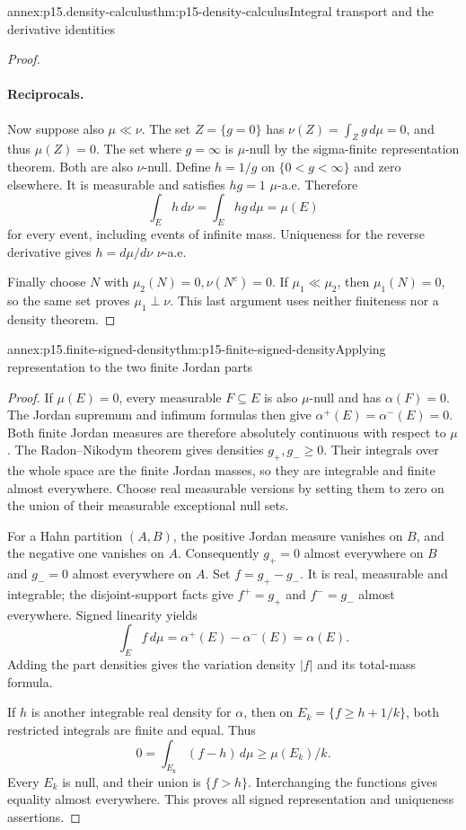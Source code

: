 \begin{annexitem}{annex:p15.density-calculus}{thm:p15-density-calculus}{Integral transport and the derivative identities}
\begin{proof}
\paragraph{Reciprocals.}
Now suppose also \(\mu\ll\nu\).
The set \(Z=\{g=0\}\) has \(\nu(Z)=\int_Zg\,d\mu=0\), and thus
\(\mu(Z)=0\). The set where \(g=\infty\) is \(\mu\)-null by the
sigma-finite representation theorem. Both are also \(\nu\)-null.
Define \(h=1/g\) on \(\{0<g<\infty\}\) and zero elsewhere.
It is measurable and satisfies \(hg=1\) \(\mu\)-a.e.
Therefore
\[
                       \int_Eh\,d\nu=\int_Ehg\,d\mu=\mu(E)
\]
for every event, including events of infinite mass.
Uniqueness for the reverse derivative gives \(h=d\mu/d\nu\)
\(\nu\)-a.e.

Finally choose \(N\) with \(\mu_2(N)=0,\nu(N^c)=0\).
If \(\mu_1\ll\mu_2\), then \(\mu_1(N)=0\), so the same
set proves \(\mu_1\perp\nu\). This last argument uses neither
finiteness nor a density theorem.
\end{proof}
\end{annexitem}

\begin{annexitem}{annex:p15.finite-signed-density}{thm:p15-finite-signed-density}{Applying representation to the two finite Jordan parts}
\begin{proof}
If \(\mu(E)=0\), every measurable \(F\subseteq E\) is also
\(\mu\)-null and has \(\alpha(F)=0\).
The Jordan supremum and infimum formulas then give
\(\alpha^+(E)=\alpha^-(E)=0\).
Both finite Jordan measures are therefore absolutely continuous
with respect to \(\mu\).
The Radon--Nikodym theorem gives densities \(g_+,g_-\geq0\).
Their integrals over the whole space are the finite Jordan masses,
so they are integrable and finite almost everywhere.
Choose real measurable versions by setting them to zero on the
union of their measurable exceptional null sets.

For a Hahn partition \((A,B)\), the positive Jordan measure vanishes
on \(B\), and the negative one vanishes on \(A\).
Consequently \(g_+=0\) almost everywhere on \(B\) and \(g_-=0\)
almost everywhere on \(A\).
Set \(f=g_+-g_-\). It is real, measurable and integrable; the
disjoint-support facts give \(f^+=g_+\) and \(f^-=g_-\) almost
everywhere. Signed linearity yields
\[
                    \int_Ef\,d\mu
                       =\alpha^+(E)-\alpha^-(E)=\alpha(E).
\]
Adding the part densities gives the variation density \(|f|\)
and its total-mass formula.

If \(h\) is another integrable real density for \(\alpha\), then
on \(E_k=\{f\geq h+1/k\}\), both restricted integrals are finite
and equal. Thus
\[
                     0=\int_{E_k}(f-h)\,d\mu\geq\mu(E_k)/k.
\]
Every \(E_k\) is null, and their union is \(\{f>h\}\).
Interchanging the functions gives equality almost everywhere.
This proves all signed representation and uniqueness assertions.
\end{proof}
\end{annexitem}

